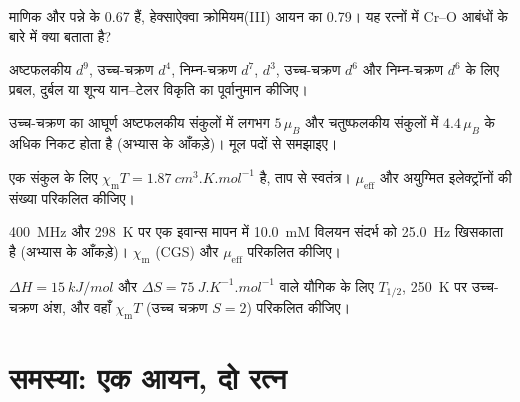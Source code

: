 \begin{exercise}[$\star\star$]\label{exo:b3:complex-spectra-magnetism:7}
माणिक और पन्ने के  0.67 हैं, हेक्साऐक्वा क्रोमियम(III)
आयन का 0.79। यह रत्नों में Cr--O आबंधों के बारे में क्या बताता है?
\end{exercise}

\begin{exercise}[$\star\star$]\label{exo:b3:complex-spectra-magnetism:8}
अष्टफलकीय $d^9$, उच्च-चक्रण
$d^4$, निम्न-चक्रण $d^7$, $d^3$, उच्च-चक्रण $d^6$ और निम्न-चक्रण $d^6$ के लिए प्रबल, दुर्बल या शून्य यान--टेलर विकृति का पूर्वानुमान कीजिए।
\end{exercise}

\begin{exercise}[$\star\star$]\label{exo:b3:complex-spectra-magnetism:9}
उच्च-चक्रण  का आघूर्ण अष्टफलकीय संकुलों में लगभग $5\,\mu_B$ और
चतुष्फलकीय संकुलों में $4.4\,\mu_B$ के अधिक निकट होता है (अभ्यास के आँकड़े)। मूल
पदों से समझाइए।
\end{exercise}

\begin{exercise}[$\star\star\star$]\label{exo:b3:complex-spectra-magnetism:10}
एक संकुल के लिए $\chi_{\mathrm m}T = \qty{1.87}{cm^3.K.mol^{-1}}$ है, ताप से स्वतंत्र। $\mu_{\mathrm{eff}}$ और
अयुग्मित इलेक्ट्रॉनों की संख्या परिकलित कीजिए।
\end{exercise}

\begin{exercise}[$\star\star\star$]\label{exo:b3:complex-spectra-magnetism:11}
\qty{400}{MHz} और \qty{298}{K} पर एक इवान्स मापन में \qty{10.0}{mM} विलयन
संदर्भ को \qty{25.0}{Hz} खिसकाता है (अभ्यास के आँकड़े)। $\chi_{\mathrm m}$ (CGS) और $\mu_{\mathrm{eff}}$ परिकलित कीजिए।
\end{exercise}

\begin{exercise}[$\star\star\star$]\label{exo:b3:complex-spectra-magnetism:12}
$\Delta H = \qty{15}{kJ/mol}$ और $\Delta S = \qty{75}{J.K^{-1}.mol^{-1}}$ वाले  यौगिक के लिए $T_{1/2}$,
\qty{250}{K} पर उच्च-चक्रण अंश, और वहाँ $\chi_{\mathrm m}T$ (उच्च चक्रण $S = 2$) परिकलित कीजिए।
\end{exercise}

\section{समस्या: एक आयन, दो रत्न}

